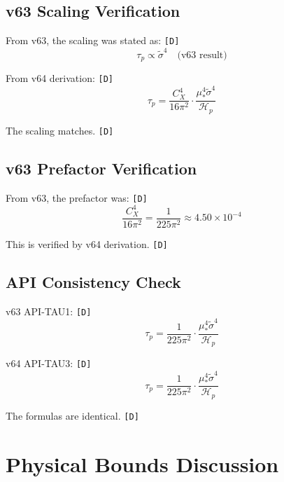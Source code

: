 \documentclass[11pt,a4paper]{article}
\newcommand{\tagD}{\textcolor{green!50!black}{\texttt{[D]}}}
\theoremstyle{definition}
\begin{document}
\subsection{v63 Scaling Verification}
\label{app:v63-verify}

From v63, the scaling was stated as: \tagD{}
\begin{equation}
\label{eq:app-v63-1}
\tau_p \propto \tilde{\sigma}^4 \quad \text{(v63 result)}
\end{equation}

From v64 derivation: \tagD{}
\begin{equation}
\label{eq:app-v63-2}
\tau_p = \frac{C_X^4}{16\pi^2} \cdot \frac{\mu_*^4 \tilde{\sigma}^4}{\mathcal{H}_p}
\end{equation}

The scaling matches. \tagD{}

\subsection{v63 Prefactor Verification}
\label{app:v63-prefactor}

From v63, the prefactor was: \tagD{}
\begin{equation}
\label{eq:app-v63-3}
\frac{C_X^4}{16\pi^2} = \frac{1}{225\pi^2} \approx 4.50 \times 10^{-4}
\end{equation}

This is verified by v64 derivation. \tagD{}

\subsection{API Consistency Check}
\label{app:api-consistency}

v63 API-TAU1: \tagD{}
\begin{equation}
\label{eq:app-v63-4}
\tau_p = \frac{1}{225\pi^2} \cdot \frac{\mu_*^4 \tilde{\sigma}^4}{\mathcal{H}_p}
\end{equation}

v64 API-TAU3: \tagD{}
\begin{equation}
\label{eq:app-v63-5}
\tau_p = \frac{1}{225\pi^2} \cdot \frac{\mu_*^4 \tilde{\sigma}^4}{\mathcal{H}_p}
\end{equation}

The formulas are identical. \tagD{}

\section{Physical Bounds Discussion}
\label{app:physical-bounds}
\end{document}
